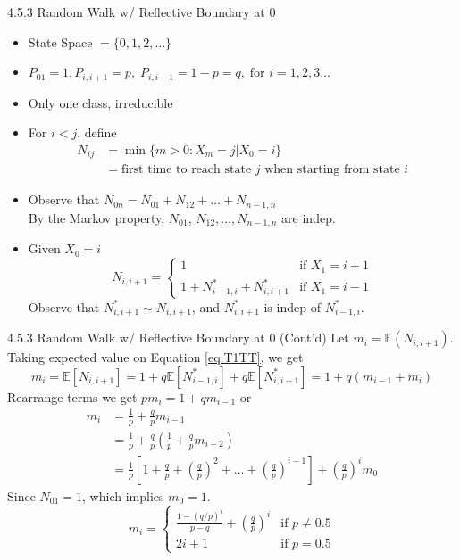 \documentclass[letterpaper,handout, mathserif]{beamer}
\def\E{\mathbb E}
\begin{document}
\begin{frame}{4.5.3 Random Walk w/ Reflective Boundary at 0}
\begin{itemize}
\item State Space $=\{0,1,2,\ldots\}$
\item $P_{01}=1, P_{i,i+1}=p, \;P_{i,i-1}=1-p=q,\;\mbox{for } i=1,2,3\ldots$
\item Only one class, irreducible
\item For $i<j$, define
\begin{align*}
N_{ij}&=\min\{m> 0: X_m=j|X_0=i\}\\
&=\mbox{first time to reach state $j$ when starting from state $i$}
\end{align*}
\item Observe that $N_{0n}=N_{01}+N_{12}+\ldots+N_{n-1,n}$\\
By the Markov property, $N_{01}$, $N_{12},\ldots,N_{n-1,n}$ are indep.
\item Given $X_0=i$
\begin{equation}\label{eq:T1TT}
N_{i,i+1}=
\begin{cases}
1 & \mbox{if } X_1=i+1\\
1 + N^{*}_{i-1,i}+ N^{*}_{i,i+1} &\mbox{if } X_1=i-1
\end{cases}
\end{equation}
Observe that $N^{*}_{i,i+1}\sim N_{i,i+1}$, and $N^{*}_{i,i+1}$ is indep of $N^{*}_{i-1,i}$.
\end{itemize}
\end{frame}
\begin{frame}{4.5.3 Random Walk w/ Reflective Boundary at 0 (Cont'd)}
Let $m_i=\E(N_{i,i+1})$. Taking expected value on Equation \eqref{eq:T1TT}, we get
$$
m_i = \E[N_{i,i+1}]=
1+ q\E[N^{*}_{i-1,i}]+q\E[N^{*}_{i,i+1}]=1+q(m_{i-1}+m_i)
$$
Rearrange terms we get $p m_i=1+q m_{i-1}$ or
\begin{align*}
m_i
&=\frac{1}{p}+\frac{q}{p} m_{i-1}\\
&=\frac{1}{p}+\frac{q}{p}(\frac{1}{p}+\frac{q}{p}m_{i-2})\\
&=\frac{1}{p}\left[1+\frac{q}{p}+(\frac{q}{p})^2+\ldots+(\frac{q}{p})^{i-1}\right]+(\frac{q}{p})^im_{0}
\end{align*}
Since $N_{01}=1$, which implies $m_0=1$.
$$
m_i=
\begin{cases}
\frac{1-(q/p)^i}{p-q}+(\frac{q}{p})^i &\mbox{if } p\neq 0.5\\
2i+1 & \mbox{if } p=0.5
\end{cases}
$$
\end{frame}
\end{document}
